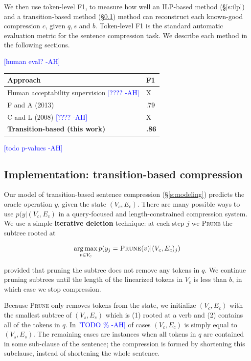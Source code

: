 \documentclass[11pt,a4paper]{article}
\newcommand{\ahcomment}[1]{\textcolor{blue}{[#1 -AH]}}
\DeclareMathOperator*{\argmaxA}{arg\,max} %
\begin{document}
We then use token-level F1, to measure how well an ILP-based method (\S\ref{s:ilp}) and a transition-based method (\S\ref{s:transition}) method can reconstruct each known-good compression $c$, given $q,s$ and $b$. Token-level F1 is the standard automatic evaluation metric for the sentence compression task. We describe each method in the following sections.

\ahcomment{human eval?}
    
\begin{table}[htb!]
\begin{tabular}{ll}
\centering
Approach & F1  \\ \hline
Human acceptability supervision \ahcomment{????}        &  X        \\
F and A (2013)    & .79           \\
C and L (2008)  \ahcomment{????}  & X      \\
\textbf{Transition-based (this work)} &  \textbf{.86}    \\   
\end{tabular}
\end{table}

\ahcomment{todo p-values}


\subsection{Implementation: transition-based compression}\label{s:transition}

Our model of transition-based sentence compression (\S\ref{s:modeling}) predicts the oracle operation $y$, given the state $(V_c, E_c)$. There are many possible ways to use $p(y|(V_c, E_c)$ in a query-focused and length-constrained compression system. We use a simple \textbf{iterative deletion} technique: at each step $j$ we \textsc{Prune} the subtree rooted at 

$$\argmaxA_{v \in V_c}   p(y_j = \textsc{Prune}(v) | (V_c, E_c)_j)$$

\noindent provided that pruning the subtree does not remove any tokens in $q$. We continue pruning subtrees until the length of the linearized tokens in $V_c$ is less than $b$, in which case we stop compression. 

Because \textsc{Prune} only removes tokens from the state, we initialize $(V_c, E_c)$ with the smallest subtree of $(V_s, E_s)$ which is (1) rooted at a verb and (2) contains all of the tokens in $q$. In \ahcomment{TODO \%} of cases $(V_c, E_c)$ is simply equal to $(V_s, E_s)$. The remaining cases are instances when all tokens in $q$ are contained in some sub-clause of the sentence; the compression is formed by shortening this subclause, instead of shortening the whole sentence.
\end{document}
